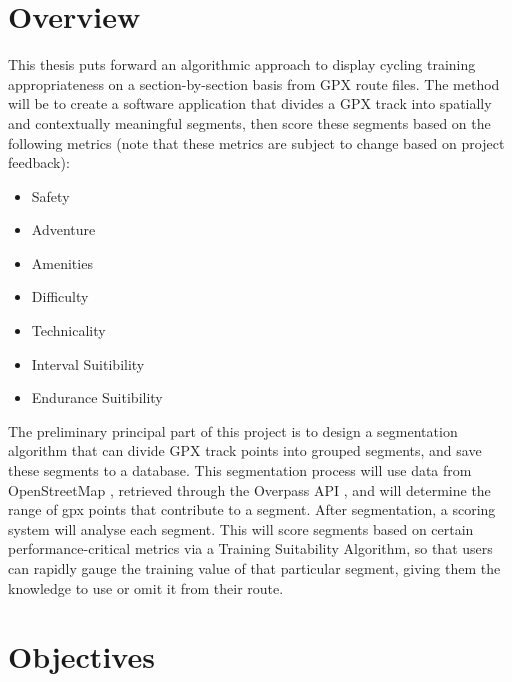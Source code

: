 \documentclass{article}
\begin{document}
\section{Overview}
This thesis puts forward an algorithmic approach to display cycling training appropriateness on a section-by-section basis from GPX route files.
The method will be to create a software application that divides a GPX track into spatially and contextually meaningful segments, then score these
segments based on the following metrics (note that these metrics are subject to change based on project feedback):
\begin{itemize}
	\item Safety
	\item Adventure
	\item Amenities
	\item Difficulty
	\item Technicality
	\item Interval Suitibility
	\item Endurance Suitibility
\end{itemize}

The preliminary principal part of this project is to design a segmentation algorithm that can divide GPX track points into grouped segments,
and save these segments to a database. This segmentation process will use data from OpenStreetMap \citep{osmwiki}, retrieved through the
Overpass API \citep{overpassapi}, and will determine the range of gpx points that contribute to a segment.
After segmentation, a scoring system will analyse each segment. This will score segments based on certain performance-critical metrics via a
Training Suitability Algorithm, so that users can rapidly gauge the training value of that particular segment, giving them the
knowledge to use or omit it from their route.


\section{Objectives}
\newcommand{\objectiveblock}[3]{%
	\stepcounter{objnum}
	\ifodd\value{objnum}
	\def\blockcolor{gray!10}
	\else
	\def\blockcolor{white}
	\fi
	\begin{tcolorbox}[
			colback=\blockcolor,
			colframe=black!10,
			arc=2mm,
			boxrule=0.3pt,
			left=5pt,
			right=5pt,
			top=5pt,
			bottom=5pt,
			width=\textwidth,
			enhanced
		]
		\textbf{#1} \\[0.5em]
		\noindent
		\begin{minipage}[t]{0.48\textwidth}
			\RaggedRight
			\textbf{Activities:}
			\begin{itemize}
				#2
			\end{itemize}
		\end{minipage}\hfill
		\begin{minipage}[t]{0.48\textwidth}
			\RaggedRight
			\textbf{Deliverables:}
			\begin{itemize}
				#3
			\end{itemize}
		\end{minipage}
	\end{tcolorbox}\vspace{1em}
}
\end{document}
